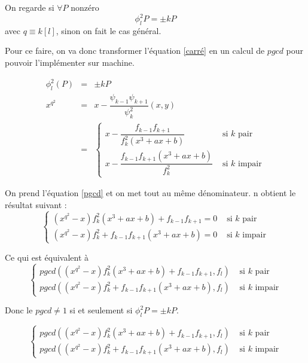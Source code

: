 \documentclass{article}%
\theoremstyle{plain}
\theoremstyle{definition}
\theoremstyle{plain}
\theoremstyle{plain}
\theoremstyle{remark}
\begin{document}
On regarde si $\forall P$ nonzéro \begin{equation}
\phi_{l}^{2}P = \pm kP
\label{carré}
\end{equation} avec $q\equiv k[l]$, sinon on fait le cas général.

Pour ce faire, on va donc transformer l'équation \eqref{carré} en un calcul de $pgcd$ pour pouvoir l'implémenter sur machine.

\begin{eqnarray}
\phi_{l}^{2}(P)&=&\pm kP \nonumber\\ 
x^{q^{2}}&=&x-\dfrac{\psi_{k - 1}\psi_{k + 1}}{\psi_{k}^{2}}(x,y)\\
&=&\begin{cases}x-\dfrac{f_{k - 1}f_{k + 1}}{f_{k}^{2}(x^{3} + ax +b)}&\text{ si }k\text{ pair}\\
x-\dfrac{f_{k - 1}f_{k + 1}(x^{3} + ax +b)}{f_{k}^{2}}&\text{ si }k\text{ impair}
\label{pgcd}
\end{cases}
\end{eqnarray}

On prend l'équation \eqref{pgcd} et on met tout au même dénominateur. n obtient le résultat suivant :
\begin{equation}
\begin{cases}(x^{q^{2}} - x)f_{k}^{2}(x^{3} + ax +b) + f_{k - 1}f_{k + 1}= 0&\text{ si }k\text{ pair}\\
(x^{q^{2}} - x)f_{k}^{2} + f_{k - 1}f_{k + 1}(x^{3} + ax +b)= 0&\text{ si }k\text{ impair}
\end{cases}
\end{equation}

Ce qui est équivalent à 
\begin{equation}
\begin{cases}pgcd((x^{q^{2}} - x)f_{k}^{2}(x^{3} + ax +b) + f_{k - 1}f_{k + 1},f_{l})&\text{ si }k\text{ pair}\\
pgcd((x^{q^{2}} - x)f_{k}^{2} + f_{k - 1}f_{k + 1}(x^{3} + ax +b),f_{l})&\text{ si }k\text{ impair}
\end{cases}
\end{equation}

Donc le $pgcd\neq 1$ si et seulement si $\phi_{l}^{2}P = \pm kP$.

\begin{equation}
\begin{cases}pgcd((x^{q^{2}} - x)f_{k}^{2}(x^{3} + ax +b) + f_{k - 1}f_{k + 1},f_{l})&\text{ si }k\text{ pair}\\
pgcd((x^{q^{2}} - x)f_{k}^{2} + f_{k - 1}f_{k + 1}(x^{3} + ax +b),f_{l})&\text{ si }k\text{ impair}
\end{cases}
\end{equation}
\end{document}
